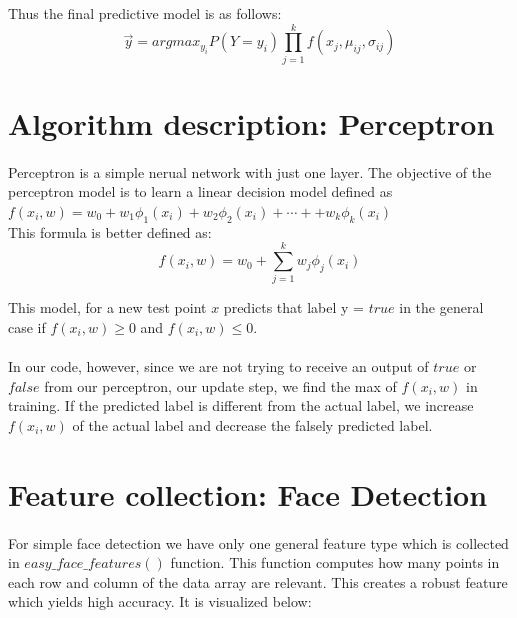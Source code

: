 \documentclass{article}
\begin{document}
Thus the final predictive model is as follows:\\
$$\Vec{y} = argmax_{y_i}P(Y=y_i)\prod_{j=1}^{k} f(x_j,\mu_{ij},\sigma_{ij})$$

\section*{Algorithm description: Perceptron}
\paragraph*{}
Perceptron is a simple nerual network with just one layer. The objective of the perceptron model is to learn a linear decision model defined as $f(x_i,w)=w_0+w_1\phi_1(x_i)+w_2\phi_2(x_i)+ \cdots + +w_k\phi_k(x_i)$\\
This formula is better defined as: 
$$f(x_i,w)=w_0+\sum_{j=1}^{k} w_j\phi_j(x_i)$$

This model, for a new test point $x$ predicts that label y = $true$ in the general case if $f(x_i,w)\geq 0$ and $f(x_i,w)\leq 0$.\\
\\
In our code, however, since we are not trying to receive an output of $true$ or $false$ from our perceptron, our update step, we find the max of $f(x_i,w)$ in training. If the predicted label is different from the actual label, we increase $f(x_i,w)$ of the actual label and decrease the falsely predicted label. 


\section*{Feature collection: Face Detection}
\paragraph*{}
For simple face detection we have only one general feature type which is collected in $easy\_face\_features()$ function. This function computes how many points in each row and column of the data array are relevant. This creates a robust feature which yields high accuracy. It is visualized below:\\
\bigskip{}

\\
\end{document}
